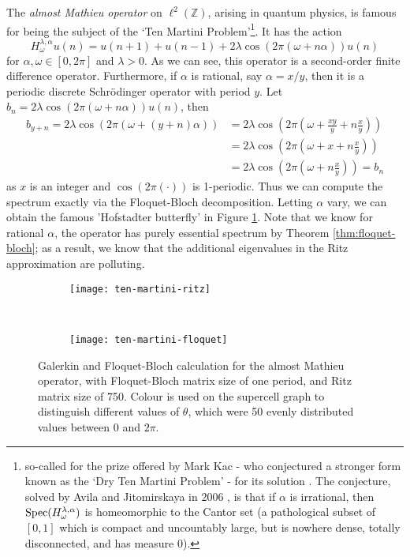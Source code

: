\documentclass[../main.tex]{subfiles}
\begin{document}
\begin{example}
The \emph{almost Mathieu operator} on $\ell^2(\mathbb{Z})$, arising in quantum physics,
is famous for being the subject of the `Ten Martini Problem'\footnote{so-called
for the prize offered by Mark Kac - who conjectured a stronger form known as the
`Dry Ten Martini Problem' - for its solution \cite{simon1982almost}.
The conjecture, solved by Avila and Jitomirskaya in 2006 \cite{avila2006ten},
is that if $\alpha$ is irrational, then $\mathrm{Spec}(H_\omega^{\lambda, \alpha})$
is homeomorphic to the Cantor set (a pathological subset of $[0, 1]$ which is 
compact and uncountably large, but is nowhere dense, totally disconnected, and has measure 0).}.
It has the action
  $$H_\omega^{\lambda, \alpha} u(n) = u(n+1) + u(n-1) + 2\lambda \cos(2\pi (\omega + n \alpha))u(n)$$
for $\alpha, \omega \in [0, 2\pi]$ and $\lambda > 0$. As we can see, this
operator is a second-order finite difference operator. Furthermore, if
$\alpha$ is rational, say $\alpha = x/y$, then it is a periodic discrete
Schr\"odinger operator with period $y$.
Let $b_n = 2\lambda \cos(2\pi (\omega + n \alpha))u(n)$, then
\begin{align*} 
  b_{y+n} = 2\lambda \cos(2\pi (\omega + (y + n) \alpha)) 
	& = 2\lambda \cos(2\pi (\omega +  \frac{xy}{y} + n \frac{x}{y})) \\
  & = 2\lambda \cos(2\pi (\omega + x + n \frac{x}{y})) \\
  & = 2\lambda \cos(2\pi (\omega + n \frac{x}{y})) = b_n 
\end{align*}
  as $x$ is an integer and $\cos(2\pi(\cdot))$ is 1-periodic. Thus we can compute the
spectrum exactly via the Floquet-Bloch decomposition. Letting $\alpha$ vary, we can obtain
the famous 'Hofstadter butterfly' \cite{hofstadter1976energy} in Figure \ref{fig:hofstadter-butterfly}.
Note that we know for rational $\alpha$, the operator has purely essential spectrum
by Theorem \ref{thm:floquet-bloch}; as a result,
we know that the additional eigenvalues in the Ritz approximation are polluting. 

\begin{figure}[p!] \centering
\begin{subfigure}{0.9\textwidth}
  \texttt{[image: ten-martini-ritz]}
  \end{subfigure}\\
  \begin{subfigure}{0.9\textwidth}
  \texttt{[image: ten-martini-floquet]} \end{subfigure}
\caption{Galerkin and Floquet-Bloch calculation for the almost Mathieu operator, 
  with Floquet-Bloch matrix
	size of one period, and Ritz matrix size of 750.
  Colour is used on the supercell graph to
	distinguish different values of $\theta$, which were 50 evenly
	distributed values between $0$ and $2 \pi$.}

\label{fig:hofstadter-butterfly}
\end{figure}
\clearpage
\end{example}
\end{document}
